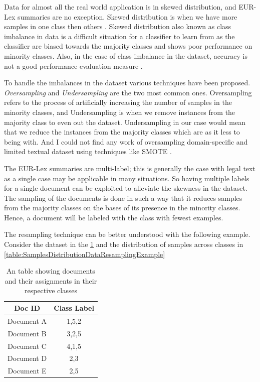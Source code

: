 Data for almost all the real world application is in skewed distribution, and EUR-Lex summaries are no exception. Skewed distribution is when we have more samples in one class then others \cite{wang2012multiclass}. Skewed distribution also known as class imbalance in data is a difficult situation for a classifier to learn from as the classifier are biased towards the majority classes and shows poor performance on minority classes. Also, in the case of class imbalance in the dataset, accuracy is not a good performance evaluation measure \cite{chawla2002smote}.  

To handle the imbalances in the dataset various techniques have been proposed. \textit{Oversampling} and \textit{Undersampling} are the two most common ones. Oversampling refers to the process of artificially increasing the number of samples in the minority classes, and Undersampling is when we remove instances from the majority class to even out the dataset. Undersampling in our case would mean that we reduce the instances from the majority classes which are as it less to being with. And I could not find any work of oversampling domain-specific and limited textual dataset using techniques like SMOTE \cite{chawla2002smote}.   

The EUR-Lex summaries are multi-label; this is generally the case with legal text as a single case may be applicable in many situations. So having multiple labels for a single document can be exploited to alleviate the skewness in the dataset. The sampling of the documents is done in such a way that it reduces samples from the majority classes on the bases of its presence in the minority classes. Hence, a document will be labeled with the class with fewest examples. 

The resampling technique can be better understood with the following example. Consider the dataset in the \ref{table:exampleDataResampling} and the distribution of samples across classes in \ref{table:SamplesDistributionDataResamplingExample}

\begin{table}[!ht]
\centering
\begin{tabular}{cc}

\hline
\textbf{Doc ID} & \textbf{Class Label} \\ \hline
Document A           & 1,5,2                \\ 
Document B           & 3,2,5                    \\ 
Document C           & 4,1,5                  \\ 
Document D           & 2,3                    \\ 
Document E           & 2,5                  \\ \hline
\end{tabular}
\captionsetup{justification=centering,margin=1cm}
\caption{An table showing documents and their assignments in their respective classes}
\label{table:exampleDataResampling}
\end{table}
\clearpage

